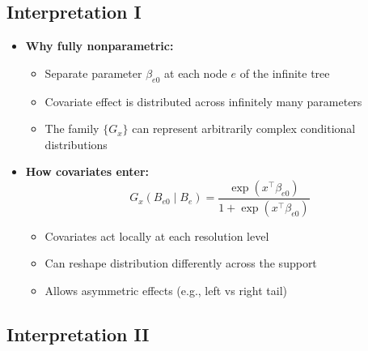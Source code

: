 \documentclass[12pt,oneside]{book}
\numberwithin{equation}{section}
\theoremstyle{definition}
\theoremstyle{plain}
\theoremstyle{remark}
\begin{document}
\subsection{Interpretation I}

\begin{itemize}
\item \textbf{Why fully nonparametric:}
\begin{itemize}
\item Separate parameter $\beta_{e0}$ at each node $e$ of the infinite tree
\item Covariate effect is distributed across infinitely many parameters
\item The family $\{G_x\}$ can represent arbitrarily complex conditional distributions
\end{itemize}

\item \textbf{How covariates enter:}
\[
G_x(B_{e0} \mid B_e) = \frac{\exp(x^\top \beta_{e0})}{1 + \exp(x^\top \beta_{e0})}
\]

\begin{itemize}
\item Covariates act locally at each resolution level
\item Can reshape distribution differently across the support
\item Allows asymmetric effects (e.g., left vs right tail)
\end{itemize}
\end{itemize}

\subsection{Interpretation II}
\end{document}
